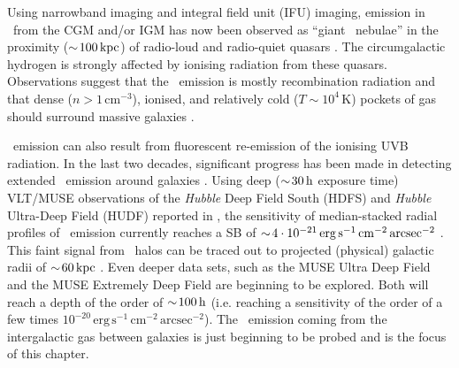 Using narrowband imaging and integral field unit (IFU) imaging, emission in \lya\ from the CGM and/or IGM has now been observed as ``giant \lya\ nebulae'' in the proximity ($\sim \! 100\,\mathrm{kpc}$) of radio-loud and radio-quiet quasars \citep{1985ApJ...299L...1D, 1991ApJ...368...28H, 1991ApJ...370...78H, 1990ApJ...365..487M, 2007A&A...461..823V, 2007MNRAS.378..416V, 2008ApJ...672...48C, 2008MNRAS.390.1505H, 2008ApJ...681..856R, 2009A&A...495..471S, 2011MNRAS.418.1115R, 2012MNRAS.425.1992C, 2013MNRAS.429..429R, 2014Natur.506...63C, 2014ApJ...786..106M, 2014MNRAS.443.3795R, 2015Sci...348..779H, 2016ApJ...829....3A, 2016ApJ...831...39B, 2016MNRAS.462.1978F, 2017ASSL..430..195C}. The circumgalactic hydrogen is strongly affected by ionising radiation from these quasars. Observations suggest that the \lya\ emission is mostly recombination radiation and that dense ($n > 1 \, \mathrm{cm^{-3}}$), ionised, and relatively cold ($T \sim 10^4 \, \mathrm{K}$) pockets of gas should surround massive galaxies \citep{2017ASSL..430..195C}.

\lya\ emission can also result from fluorescent re-emission of the ionising UVB radiation. In the last two decades, significant progress has been made in detecting extended \lya\ emission around galaxies \citep{1996ApJ...457..490F, 1999MNRAS.305..849F, 1999AJ....118.2547K, 2000ApJ...532..170S, 2004AJ....128.2073H, 2008ApJ...681..856R, 2011ApJ...736..160S, 2012MNRAS.425..878M, 2013ApJ...762...38P, 2014MNRAS.442..110M, 2016ApJ...832...37G, 2016A&A...587A..98W, 2017ApJ...837...71C, 2017A&A...608A...8L, 2017MNRAS.465.3803V, 2018ApJ...856...72O, 2018Natur.562..229W, 2019MNRAS.482.3162A}. Using deep ($\sim \! 30 \, \mathrm{h}$ exposure time) VLT/MUSE observations of the \textit{Hubble} Deep Field South (HDFS) and \textit{Hubble} Ultra-Deep Field (HUDF) reported in \citet{2015A&A...575A..75B, 2017A&A...608A...1B}, the sensitivity of median-stacked radial profiles of \lya\ emission currently reaches a SB of $\sim \! 4 \cdot 10^{-21} \, \mathrm{erg \, s^{-1} \, cm^{-2} \, arcsec^{-2}}$ \citep{2018Natur.562..229W}. This faint signal from \lya\ halos can be traced out to projected (physical) galactic radii of $\sim \! 60 \, \mathrm{kpc}$ \citep{2018Natur.562..229W}. Even deeper data sets, such as the MUSE Ultra Deep Field \citep[MUDF, described in][]{2019MNRAS.485L..62L} and the MUSE Extremely Deep Field \citep[MXDF, see][]{2021A&A...647A.107B} are beginning to be explored. Both will reach a depth of the order of $\sim \! 100 \, \mathrm{h}$ (i.e. reaching a sensitivity of the order of a few times $10^{-20} \, \mathrm{erg \, s^{-1} \, cm^{-2} \, arcsec^{-2}}$). The \lya\ emission coming from the intergalactic gas between galaxies is just beginning to be probed and is the focus of this chapter.

